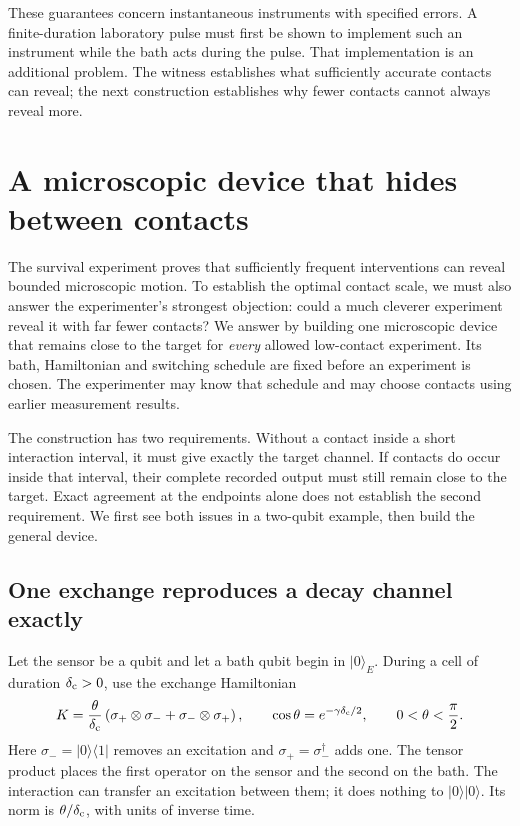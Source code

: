 \documentclass[11pt,a4paper]{article}
\numberwithin{equation}{section}
\theoremstyle{remark}
\begin{document}
These guarantees concern instantaneous instruments with specified
errors. A finite-duration laboratory pulse must first be shown to
implement such an instrument while the bath acts during the pulse.
That implementation is an additional problem. The witness establishes
what sufficiently accurate contacts can reveal; the next construction
establishes why fewer contacts cannot always reveal more.


\section{A microscopic device that hides between contacts}
\label{sim:construction}

The survival experiment proves that sufficiently frequent interventions can
reveal bounded microscopic motion. To establish the optimal contact scale,
we must also answer the experimenter's strongest objection: could a much
cleverer experiment reveal it with far fewer contacts? We answer by building
one microscopic device that remains close to the target for \emph{every}
allowed low-contact experiment. Its bath, Hamiltonian and switching schedule
are fixed before an experiment is chosen. The experimenter may know that
schedule and may choose contacts using earlier measurement results.

The construction has two requirements. Without a contact inside a short
interaction interval, it must give exactly the target channel. If contacts
do occur inside that interval, their complete recorded output must still
remain close to the target. Exact agreement at the endpoints alone does
not establish the second requirement. We first see both issues in a
two-qubit example, then build the general device.

\subsection{One exchange reproduces a decay channel exactly}
\label{sim:exchange}

Let the sensor be a qubit and let a bath qubit begin in $|0\rangle_E$.
During a cell of duration $\delta_{\rm c}>0$, use the exchange Hamiltonian
\begin{equation}
 K=\frac{\theta}{\delta_{\rm c}}
 \left(\sigma_+\otimes\sigma_-+
       \sigma_-\otimes\sigma_+\right),
 \qquad \cos\theta=e^{-\gamma \delta_{\rm c}/2},
 \qquad 0<\theta<\frac\pi2.
 \label{sim:exchange-hamiltonian}
\end{equation}
Here $\sigma_-=|0\rangle\langle1|$ removes an excitation and
$\sigma_+=\sigma_-^\dagger$ adds one. The tensor product places the first
operator on the sensor and the second on the bath. The interaction can
transfer an excitation between them; it does nothing to $|0\rangle|0\rangle$.
Its norm is $\theta/\delta_{\rm c}$, with units of inverse time.
\end{document}
